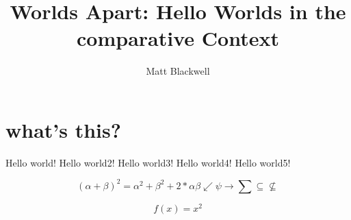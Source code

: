 \documentclass[legalpaper, 12pt, twocolumn]{article}
\title{Worlds Apart: Hello Worlds in the comparative Context}
\author{Matt Blackwell}
\begin{document}
    \maketitle
    \section {what's this?}
    Hello world!
    Hello world2!
    Hello world3!
    Hello world4!
    Hello world5!

    \begin{equation}
        (\alpha + \beta)^2 = \alpha^2 + \beta^2 + 2 * \alpha\beta
        \swarrow
        \psi
        \longrightarrow
        \sum
        \subseteq
        \not\subseteq
    \end{equation}

    $$f(x)=x^2$$
\end{document}

